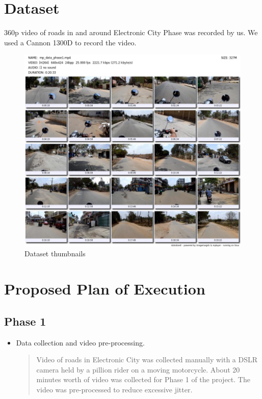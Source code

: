 \documentclass[12pt,a4paper]{article}
\begin{document}
\section{Dataset}
360p video of roads in and around Electronic City Phase was recorded by us. We used a Cannon 1300D to record the video. 


\begin{figure}[!h]
\centering
\includegraphics[width=1.0\textwidth]{datasets.jpg}
\caption{Dataset thumbnails}
\end{figure}

\newpage

\section{Proposed Plan of Execution}

\subsection{Phase 1}
\begin{itemize}
\item Data collection and video pre-processing.
\begin{quote}
Video of roads in Electronic City was collected manually with a DSLR camera held by a pillion rider on a moving motorcycle. About 20 minutes worth of video was collected for Phase 1 of the project. The video was pre-processed to reduce excessive jitter.
\end{quote}

\end{itemize}
\end{document}
